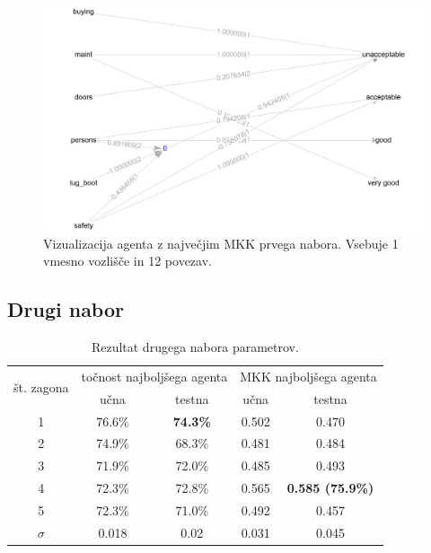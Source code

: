 \begin{figure}[H]
    \begin{center}
        \includegraphics[width=13cm]{car/1/mcc_g}
    \end{center}
    \caption{Vizualizacija agenta z največjim MKK prvega nabora. Vsebuje 1 vmesno vozlišče in 12 povezav.}
    \label{fig:car_mcc_1_g}
\end{figure}

\subsection{Drugi nabor}\label{subsec:dodatek-car-drugi-nabor}
\begin{table}[H]
    \begin{center}
        \begin{tabular}{|| c | c c || c c ||}
            \hline
            \multirow{2}{*}{št. zagona} & \multicolumn{2}{c||}{točnost najboljšega agenta} & \multicolumn{2}{c||}{MKK najboljšega agenta} \\ \cline{2-5}
            & učna   & testna          & učna  & testna                  \\
            \hline
            1        & 76.6\% & \textbf{74.3\%} & 0.502 & 0.470                   \\
            \hline
            2        & 74.9\% & 68.3\%          & 0.481 & 0.484                   \\
            \hline
            3        & 71.9\% & 72.0\%          & 0.485 & 0.493                   \\
            \hline
            4        & 72.3\% & 72.8\%          & 0.565 & \textbf{0.585 (75.9\%)} \\
            \hline
            5        & 72.3\% & 71.0\%          & 0.492 & 0.457                   \\
            \hline
            $\sigma$ & 0.018  & 0.02            & 0.031 & 0.045                   \\
            \hline
        \end{tabular}
    \end{center}
    \caption{Rezultat drugega nabora parametrov.}
    \label{tab:car_result_2}
\end{table}

